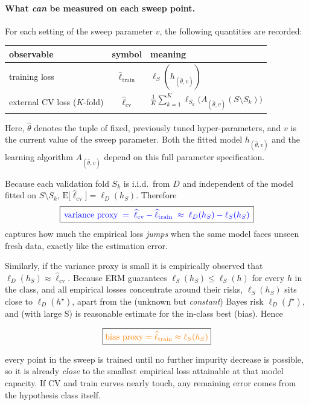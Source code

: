 \documentclass[12pt]{report}
\begin{document}
\paragraph{What \emph{can} be measured on each sweep point.}

For each setting of the sweep parameter $v$, the following quantities are recorded:
\begin{center}
\begin{tabular}{lcl}
  \toprule
  observable & symbol & meaning \\ \midrule
  training loss & $\widehat \ell_{\text{train}}$
    & $\ell_S(h_{(\hat\theta, v)})$ \\[4pt]
  external CV loss ($K$-fold)
    & $\widehat \ell_{\text{cv}}$
    & $\displaystyle
      \frac{1}{K} \sum_{k=1}^{K}
      \ell_{S_k}\bigl(A_{(\hat\theta, v)}(S \setminus S_k)\bigr)$ \\ \bottomrule
\end{tabular}
\end{center}

Here, $\hat\theta$ denotes the tuple of fixed, previously tuned hyper-parameters, 
and $v$ is the current value of the sweep parameter. Both the fitted model 
$h_{(\hat\theta, v)}$ and the learning algorithm $A_{(\hat\theta, v)}$ depend on this 
full parameter specification.

Because each validation fold $S_k$ is i.i.d.\ from $D$ and independent of the model 
fitted on $S\setminus S_k$, $\mathrm{E}\!\bigl[\widehat
\ell_{\text{cv}}\bigr]=\ell_D(h_S)$. Therefore
\[
  \boxed{\,%
  \color{blue}{\text{variance proxy}}
  \;=\;\widehat \ell_{\text{cv}}-\widehat \ell_{\text{train}}
  \;\approx\; \ell_D(h_S)-\ell_S(h_S)
  \,}
\]
captures how much the empirical loss \emph{jumps} when the same model faces unseen fresh
 data, exactly like the estimation error.

Similarly, if the variance proxy is small it is empirically observed that
$\ell_D(h_S)\approx\widehat \ell_{\text{cv}}$. Because ERM guarantees
$\ell_S(h_S)\le \ell_S(h)$ for every $h$ in the class, and all empirical losses 
concentrate around their risks, $\ell_S(h_S)$ sits close to $\ell_D(h^\star)$, apart from
the (unknown but \emph{constant}) Bayes risk $\ell_D(f^\star)$, and (with large S) is 
reasonable estimate for the in-class best (bias). Hence

\[
  \boxed{
  \color{orange}{\text{bias proxy}}
  =\widehat \ell_{\text{train}}
  \approx \ell_S(h_S) 
  }
\]

every point in the sweep is trained until no further impurity decrease is possible, 
so it is already \emph{close} to the smallest empirical loss attainable at that model 
capacity. If CV and train curves nearly touch, any remaining error comes from the 
hypothesis class itself.
\end{document}
